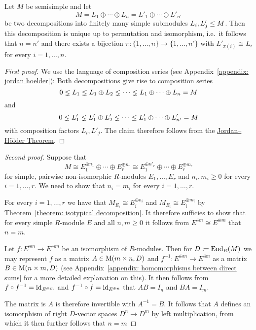 \begin{lemma}
  \label{lemma: multiplicities for finite length}
  Let $M$ be semisimple and let
  \[
      M
    = L_1 \oplus \dotsb \oplus L_n
    = L'_1 \oplus \dotsb \oplus L'_{n'}
  \]
  be two decompositions into finitely many simple submodules $L_i, L'_j \leq M$.
  Then this decomposition is unique up to permutation and isomorphism, i.e.\ it follows that $n = n'$ and there exists a bijection $\pi \colon \{1, \dotsc, n\} \to \{1, \dotsc, n'\}$ with $L'_{\pi(i)} \cong L_i$ for every $i = 1, \dotsc, n$.
\end{lemma}


\begin{proof}[First proof]
  We use the language of composition series (see Appendix~\ref{appendix: jordan hoelder}):
  Both decompositions give rise to composition series
  \[
                0
    \lneq  L_1
    \lneq  L_1 \oplus L_2
    \lneq  \dotsb
    \lneq  L_1 \oplus \dotsb \oplus L_n
    =           M
  \]
  and
  \[
                0
    \lneq  L'_1
    \lneq  L'_1 \oplus L'_2
    \lneq  \dotsb
    \lneq  L'_1 \oplus \dotsb \oplus L'_{n'}
    =           M
  \]
  with composition factors $L_i, L'_j$.
  The claim therefore follows from the \hyperref[theorem: jordan hoelder theorem]{Jordan--Hölder Theorem}.
\end{proof}


\begin{proof}[Second proof]
  Suppose that
  \[
          M
    \cong E_1^{\oplus n_1} \oplus \dotsb \oplus E_r^{\oplus n_r}
    \cong E_1^{\oplus n'_r} \oplus \dotsb \oplus E_r^{\oplus m_r}
  \]
  for simple, pairwise non-isomorphic $R$-modules $E_1, \dotsc, E_r$ and $n_i, m_i \geq 0$ for every $i = 1, \dotsc, r$.
  We need to show that $n_i = m_i$ for every $i = 1, \dotsc, r$.
  
  For every $i = 1, \dotsc, r$ we have that $M_{E_i} \cong E_i^{\oplus n_i}$ and $M_{E_i} \cong E_i^{\oplus m_i}$ by Theorem~\ref{theorem: isotypical decomposition}.
  It therefore sufficies to show that for every simple $R$-module $E$ and all $n, m \geq 0$ it follows from $E^{\oplus n} \cong E^{\oplus m}$ that $n = m$.
  
  Let $f \colon E^{\oplus n} \to E^{\oplus m}$ be an isomorphism of $R$-modules.
  Then for $D \coloneqq \operatorname{End}_R(M)$ we may represent $f$ as a matrix $A \in \operatorname{M}(m \times n, D)$ and $f^{-1} \colon E^{\oplus m} \to E^{\oplus n}$ as a matrix $B \in \operatorname{M}(n \times m, D)$ (see Appendix~\ref{appendix: homomorphisms between direct sums} for a more detailed explanation on this).
  It then follows from $f \circ f^{-1} = \operatorname{id}_{E^{\oplus m}}$ and $f^{-1} \circ f = \operatorname{id}_{E^{\oplus n}}$ that $AB = I_n$ and $BA = I_m$.
  
  The matrix is $A$ is therefore invertible with $A^{-1} = B$.
  It follows that $A$ defines an isomorphism of right $D$-vector spaces $D^n \to D^{m}$ by left multiplication, from which it then further follows that $n = m$
\end{proof}


